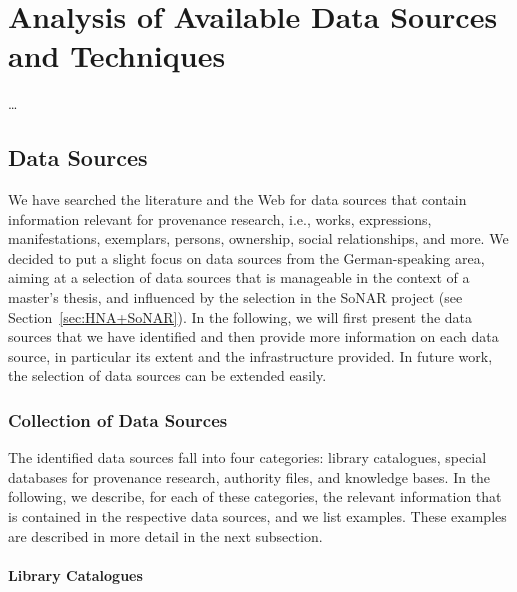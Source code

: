\chapter{Analysis of Available Data Sources and Techniques}
\label{chap:analysis}

\dots


\section{Data Sources}
\label{sec:data_sources}

We have searched the literature and the Web for data sources that contain information
relevant for provenance research, i.e., works, expressions, manifestations, exemplars,
persons, ownership, social relationships, and more. 
We decided to put a slight focus on data sources from the German-speaking area, 
aiming at a selection of data sources that is manageable in the context of a master's thesis,
and influenced by the selection in the \gls{SoNAR} project (see Section~\ref{sec:HNA+SoNAR}).
In the following, we will first present the data sources that we have identified
and then provide more information on each data source,
in particular its extent and the infrastructure provided.
In future work, the selection of data sources can be extended easily.

\subsection{Collection of Data Sources}

The identified data sources fall into four categories:
library catalogues, special databases for provenance research, authority files, and knowledge bases.
In the following, we describe, for each of these categories, the relevant information that is
contained in the respective data sources, and we list examples.
These examples are described in more detail in the next subsection.

\subsubsection{Library Catalogues}

